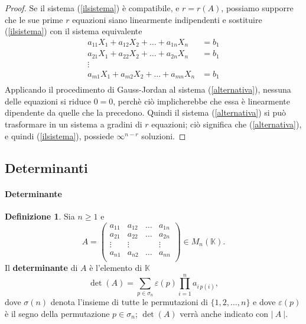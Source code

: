 \documentclass{article}
\theoremstyle{plain}
\theoremstyle{definition}
\newtheorem{defn}{Definizione}[section]
\theoremstyle{remark}
\begin{document}
\begin{proof}
    Se il sistema (\ref{ilsistema}) è compatibile, e $r=r(A)$, possiamo supporre che le sue prime $r$ equazioni siano linearmente indipendenti e sostituire (\ref{ilsistema}) con il sistema equivalente
    \begin{equation}\label{alternativa}
        \begin{aligned}
            a_{11}X_1+a_{12}X_2+\dots+a_{1n}X_n&=b_1\\
            a_{21}X_1+a_{22}X_2+\dots+a_{2n}X_n&=b_1\\
            \vdots\quad\quad\quad\quad&\\
            a_{m1}X_1+a_{m2}X_2+\dots+a_{mn}X_n&=b_1\\
        \end{aligned}
    \end{equation}
    Applicando il procedimento di Gauss-Jordan al sistema (\ref{alternativa}), nessuna delle equazioni si riduce $0=0$, perchè ciò implicherebbe che essa è linearmente dipendente da quelle che la precedono.
    Quindi il sistema (\ref{alternativa}) si può trasformare in un sistema a gradini di $r$ equazioni; ciò significa che (\ref{alternativa}), e quindi (\ref{ilsistema}), possiede $\infty^{n-r}$ soluzioni.
\end{proof}

\vspace{50pt}
\subsection{Determinanti}
\vspace{20pt}

\paragraph{Determinante}
\begin{bxthm}
\begin{defn}
    Sia $n\geq1$ e 
    \[A=\begin{pmatrix}
        a_{11}&a_{12}&\dots&a_{1n}\\
        a_{21}&a_{22}&\dots&a_{2n}\\
        \vdots&\vdots&&\vdots\\
        a_{n1}&a_{n2}&\dots&a_{nn}\\
    \end{pmatrix}\in M_n(\mathbb{K}).\]
    Il \textbf{determinante} di $A$ è l'elemento di $\mathbb{K}$
    \begin{equation}\label{det}
        \det(A)=\sum_{p\in\sigma_n}\varepsilon(p)\prod_{i=1}^{n}a_{i\,p(i)},
    \end{equation}
    dove $\sigma(n)$ denota l'insieme di tutte le permutazioni di $\{1,2,\dots,n\}$ e dove $\varepsilon(p)$ è il segno della permutazione $p\in \sigma_n$;
    $\det(A)$ verrà anche indicato con $|\ A\ |$.
\end{defn}
\end{bxthm}
\end{document}
